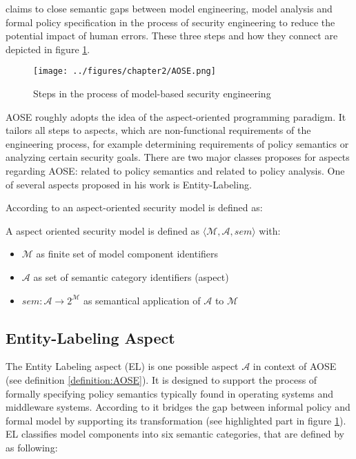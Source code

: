 \documentclass[twoside, openright, 12pt]{book}
\begin{document}
\cite{Amthor18} claims to close semantic gaps between model engineering, model analysis and formal policy specification in the process of security engineering to reduce the potential impact of human errors.
These three steps and how they connect are depicted in figure \ref{fig:AOSE}.

\begin{figure}[htb]
	\centering
	\texttt{[image: ../figures/chapter2/AOSE.png]}
	\caption{Steps in the process of model-based security engineering \citep{Amthor18}}
	\label{fig:AOSE}
\end{figure}

\noindent
AOSE roughly adopts the idea of the aspect-oriented programming paradigm.
It tailors all steps to aspects, which are non-functional requirements of the engineering process, for example determining requirements of policy semantics or analyzing certain security goals.
There are two major classes \cite{Amthor18} proposes for aspects regarding AOSE: related to policy semantics and related to policy analysis.
One of several aspects proposed in his work is Entity-Labeling.

According to \cite{Amthor18} an aspect-oriented security model is defined as:

\begin{xdefinition} 
A aspect oriented security model is defined as $\langle \mathcal{M},\mathcal{A},sem \rangle$ with:

\vspace{-2mm}
\begin{itemize}
\setlength\itemsep{0em}
\item $\mathcal{M}$ as finite set of model component identifiers
\item $\mathcal{A}$ as set of semantic category identifiers (aspect)
\item $sem : \mathcal{A} \rightarrow 2^\mathcal{M}$ as semantical application of $\mathcal{A}$ to $\mathcal{M}$
\end{itemize}
\label{definition:AOSE}
\end{xdefinition}



\subsection{Entity-Labeling Aspect}
\label{EL}
The Entity Labeling aspect (EL) is one possible aspect $\mathcal{A}$ in context of AOSE (see definition \ref{definition:AOSE}).
It is designed to support the process of formally specifying policy semantics typically found in operating systems and middleware systems.
According to \cite{Amthor18} it bridges the gap between informal policy and formal model by supporting its transformation (see highlighted part in figure \ref{fig:AOSE}).
EL classifies model components into six semantic categories, that are defined by \cite{Amthor18} as following:
\end{document}

